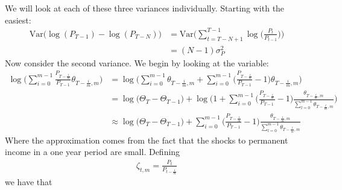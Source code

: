 We will look at each of these three variances individually. Starting with the easiest:
\begin{align*}
 \mathrm{Var}\Big(\log(P_{T-1})-\log(P_{T-N}) \Big)
&=  \mathrm{Var}\Bigg( \sum_{t=T-N+1}^{T-1} \log \Big(\frac{P_t}{P_{t-1}}\Big) \Bigg) \\
&= (N-1)\sigma^2_P
\end{align*}
Now consider the second variance. We begin by looking at the variable:
\begin{align*}
\log \Bigg(\sum_{i=0}^{m-1} \frac{P_{T-\frac{i}{m}}}{P_{T-1}} \theta_{T-\frac{i}{m},m} \Bigg)
&= \log \Bigg(\sum_{i=0}^{m-1} \theta_{T-\frac{i}{m},m} + \sum_{i=0}^{m-1} \Big(\frac{P_{T-\frac{i}{m}}}{P_{T-1}}-1\Big) \theta_{T-\frac{i}{m},m} \Bigg) \\
&= \log\Big( \Theta_T-\Theta_{T-1}\Big) + \log \Bigg(1 + \sum_{i=0}^{m-1} \Big(\frac{P_{T-\frac{i}{m}}}{P_{T-1}}-1\Big) \frac{\theta_{T-\frac{i}{m},m}}{\sum_{l=0}^{m-1} \theta_{T-\frac{l}{m},m}} \Bigg) \\
&\approx \log\Big( \Theta_T-\Theta_{T-1}\Big) +  \sum_{i=0}^{m-1} \Big(\frac{P_{T-\frac{i}{m}}}{P_{T-1}}-1\Big) \frac{\theta_{T-\frac{i}{m},m}}{\sum_{l=0}^{m-1} \theta_{T-\frac{l}{m},m}}
\end{align*}
Where the approximation comes from the fact that the shocks to permanent income in a one year period are small. Defining
\begin{align*}
\zeta_{t,m} = \frac{P_{t}}{P_{t-\frac{1}{m}}}
\end{align*}
we have that

